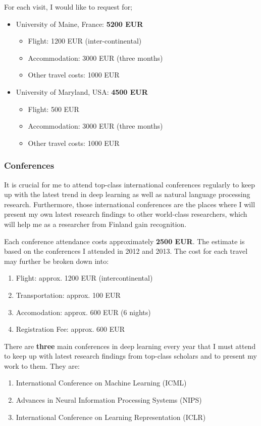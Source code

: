 \documentclass[11pt, oneside]{essay}
\begin{document}
For each visit, I would like to request for;
\begin{itemize}
\item University of Maine, France: \textbf{5200 EUR}
\begin{itemize}
    \item Flight: 1200 EUR (inter-continental)
    \item Accommodation: 3000 EUR (three months)
    \item Other travel costs: 1000 EUR
\end{itemize}
\item University of Maryland, USA: \textbf{4500 EUR}
\begin{itemize}
    \item Flight: 500 EUR
    \item Accommodation: 3000 EUR (three months)
    \item Other travel costs: 1000 EUR
\end{itemize}
\end{itemize}


\subsubsection{Conferences}

It is crucial for me to attend top-class international
conferences regularly to keep up with the latest trend in deep
learning as well as natural language processing research.
Furthermore, those international conferences are the places where
I will present my own latest research findings to other
world-class researchers, which will help me as a researcher from
Finland gain recognition.

Each conference attendance costs approximately \textbf{2500 EUR}.
The estimate is based on the conferences I attended in 2012 and
2013. The cost for each travel may further be broken down into:
\begin{enumerate}
    \item Flight: approx. 1200 EUR (intercontinental)
    \item Transportation: approx. 100 EUR
    \item Accomodation: approx. 600 EUR (6 nights)
    \item Registration Fee: approx. 600 EUR
\end{enumerate}

There are \textbf{three} main conferences in deep learning every
year that I must attend to keep up with latest research findings
from top-class scholars and to present my work to them. They are:
\begin{enumerate}
    \item International Conference on Machine Learning (ICML)
    \item Advances in Neural Information Processing Systems (NIPS)
    \item International Conference on Learning Representation (ICLR)
\end{enumerate}
\end{document}
